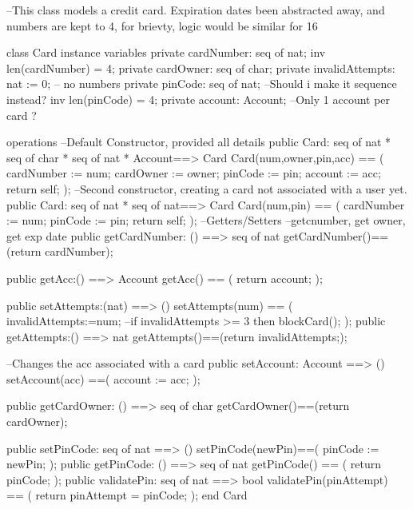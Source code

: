 \documentclass[a4paper]{article}
\begin{document}
\title{}
\author{}
\begin{vdm_al}
--This class models a credit card. Expiration dates been abstracted away, and numbers are kept to 4, for brievty, logic would be similar for 16

class Card
instance variables
    private cardNumber: seq of nat;
    inv len(cardNumber) = 4;
    private cardOwner: seq of char;
    private invalidAttempts: nat := 0;
    -- no numbers
    private pinCode: seq of nat; --Should i make it sequence instead?
    inv len(pinCode) = 4;
    private account: Account; --Only 1 account per card ? 
    
operations
    --Default Constructor, provided all details
    public Card: seq of nat  * seq of char * seq of nat * Account==> Card
    Card(num,owner,pin,acc) == (
        cardNumber := num;
        cardOwner := owner;
        pinCode := pin;
        account := acc;
        return self;
    );
    --Second constructor, creating a card not associated with a user yet.
    public Card: seq of nat * seq of nat==> Card
    Card(num,pin) == (
        cardNumber := num;
        pinCode := pin;
        return self;
    );
    --Getters/Setters
    --getcnumber, get owner, get exp date
    public getCardNumber: () ==> seq of nat
    getCardNumber()==(return cardNumber);
    
    public getAcc:() ==> Account
    getAcc() == (
        return account;
    );

    public setAttempts:(nat) ==> ()
    setAttempts(num) == (
        invalidAttempts:=num;
        --if invalidAttempts >= 3 then blockCard();
    );
    public getAttempts:() ==> nat
    getAttempts()==(return invalidAttempts;);

    --Changes the acc associated with a card
    public setAccount: Account ==> () 
    setAccount(acc) ==(
        account := acc;
    );

    public getCardOwner: () ==> seq of char
    getCardOwner()==(return cardOwner);

    public setPinCode: seq of nat ==> ()
    setPinCode(newPin)==(
        pinCode := newPin;
    );
    public getPinCode: () ==> seq of nat 
    getPinCode() == (
        return pinCode;
    );
    public validatePin: seq of nat ==> bool
    validatePin(pinAttempt) == (
        return pinAttempt = pinCode;
    );
end Card
\end{vdm_al}
\bigskip
\end{document}
